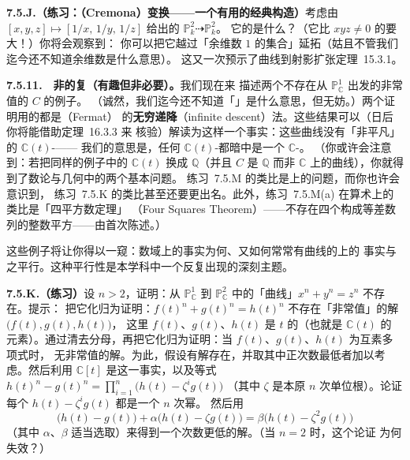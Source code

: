 \textbf{7.5.J.（练习：\trCremona{}（Cremona）变换——一个有用的经典构造）}\quad 考虑由%
$[x,y,z]\mapsto[1/x,\,1/y,\,1/z]$ 给出的\trRationalMap{} $\mathbb{P}^2_k\dashrightarrow\mathbb{P}^2_k$。%
它的\trDomainOfDefinition{}是什么？（它比 $xyz\neq 0$ 的\trLocus{}要大！）你将会观察到：%
你可以把它越过「余维数 $1$ 的集合」延拓（姑且不管我们迄今还不知道余维数是什么意思）。%
这又一次预示了曲线到射影扩张定理~15.3.1。

\textbf{7.5.11.}\ \hard\ \textbf{非\trRational{}的复\trCurve{}（有趣但非必要）。}\quad 我们现在来%
描述两个不存在从 $\mathbb{P}^1_{\mathbb{C}}$ 出发的非常值\trRationalMap{}的\trCurve{} $C$ 的例子。%
（诚然，我们迄今还不知道「\trCurve」是什么意思，但无妨。）两个证明用的都是\trFermat{}（Fermat）%
的\textbf{无穷递降}（infinite descent）法。这些结果可以（日后你将能借助定理~16.3.3 来%
核验）解读为这样一个事实：这些曲线没有「非平凡」的 $\mathbb{C}(t)$-\trValuedPoint——%
我们的意思是，任何 $\mathbb{C}(t)$-\trValuedPoint{}都暗中是一个 $\mathbb{C}$-\trValuedPoint。%
（你或许会注意到：若把同样的例子中的 $\mathbb{C}(t)$ 换成 $\mathbb{Q}$（并且 $C$ 是%
$\mathbb{Q}$ 而非 $\mathbb{C}$ 上的曲线），你就得到了数论与几何中的两个基本问题。%
练习~7.5.M 的类比是\trEllipticCurve{}上\trRationalPoint{}的问题，而你也许会意识到，%
练习~7.5.K 的类比甚至还要更出名。此外，练习~7.5.M(a) 在算术上的类比是「四平方数定理」%
（Four Squares Theorem）——不存在四个构成等差数列的整数平方——由\trFermat{}首次陈述。）

这些例子将让你得以一窥：数域上的事实为何、又如何常常有曲线的\trFunctionField{}上的%
事实与之平行。这种平行性是本学科中一个反复出现的深刻主题。

\textbf{7.5.K.（练习）}\quad 设 $n>2$，证明：从 $\mathbb{P}^1_{\mathbb{C}}$ 到%
$\mathbb{P}^2_{\mathbb{C}}$ 中的「\trFermat{}曲线」$x^n+y^n=z^n$ 不存在\trDominant{}\trRationalMap{}。提示：%
把它化归为证明：$f(t)^n+g(t)^n=h(t)^n$ 不存在「非常值」的解 $\bigl(f(t),g(t),h(t)\bigr)$，%
这里 $f(t)$、$g(t)$、$h(t)$ 是 $t$ 的\trRationalFunction（也就是 $\mathbb{C}(t)$ 的%
元素）。通过清去分母，再把它化归为证明：当 $f(t)$、$g(t)$、$h(t)$ 为互素多项式时，%
无非常值的解。为此，假设有解存在，并取其中正次数最低者加以考虑。然后利用 $\mathbb{C}[t]$ %
是\trUFD{}这一事实，以及等式 $h(t)^n-g(t)^n=\prod_{i=1}^{n}\bigl(h(t)-\zeta^i g(t)\bigr)$ %
（其中 $\zeta$ 是本原 $n$ 次单位根）。论证每个 $h(t)-\zeta^i g(t)$ 都是一个 $n$ 次幂。%
然后用
\[
\bigl(h(t)-g(t)\bigr)+\alpha\bigl(h(t)-\zeta g(t)\bigr)=\beta\bigl(h(t)-\zeta^2 g(t)\bigr)
\]
（其中 $\alpha$、$\beta$ 适当选取）来得到一个次数更低的解。（当 $n=2$ 时，这个论证%
为何失效？）

